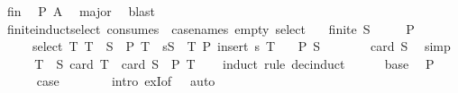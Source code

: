 \begin{isabellebody}
\ fin\ \isamarkupfalse%
\ {\isachardoublequoteopen}P\ A{\isachardoublequoteclose}\ \isamarkupfalse%
\ major\ \isamarkupfalse%
\ blast\isanewline
{}\isamarkupfalse%
%
\endisatagproof
{\isafoldproof}%
%
\isadelimproof
\isanewline
%
\endisadelimproof
\isanewline
{}\isamarkupfalse%
\ finite{\isacharunderscore}{\kern0pt}induct{\isacharunderscore}{\kern0pt}select\ {\isacharbrackleft}{\kern0pt}consumes\ {}{\isacharcomma}{\kern0pt}\ case{\isacharunderscore}{\kern0pt}names\ empty\ select{\isacharbrackright}{\kern0pt}{\isacharcolon}{\kern0pt}\isanewline
\ \ \ {\isachardoublequoteopen}finite\ S{\isachardoublequoteclose}\isanewline
\ \ \ \ \ {\isachardoublequoteopen}P\ {\isacharbraceleft}{\kern0pt}{\isacharbraceright}{\kern0pt}{\isachardoublequoteclose}\isanewline
\ \ \ \ \ select{\isacharcolon}{\kern0pt}\ {\isachardoublequoteopen}{\isasymAnd}T{\isachardot}{\kern0pt}\ T\ {\isasymsubset}\ S\ {\isasymLongrightarrow}\ P\ T\ {\isasymLongrightarrow}\ {\isasymexists}s{\isasymin}S\ {\isacharminus}{\kern0pt}\ T{\isachardot}{\kern0pt}\ P\ {\isacharparenleft}{\kern0pt}insert\ s\ T{\isacharparenright}{\kern0pt}{\isachardoublequoteclose}\isanewline
\ \ \ {\isachardoublequoteopen}P\ S{\isachardoublequoteclose}\isanewline
%
\isadelimproof
%
\endisadelimproof
%
\isatagproof
{}\isamarkupfalse%
\ {\isacharminus}{\kern0pt}\isanewline
\ \ \isamarkupfalse%
\ {\isachardoublequoteopen}{}\ {\isasymle}\ card\ S{\isachardoublequoteclose}\ \isamarkupfalse%
\ simp\isanewline
\ \ \isamarkupfalse%
\ \isamarkupfalse%
\ {\isachardoublequoteopen}{\isasymexists}T\ {\isasymsubseteq}\ S{\isachardot}{\kern0pt}\ card\ T\ {\isacharequal}{\kern0pt}\ card\ S\ {\isasymand}\ P\ T{\isachardoublequoteclose}\isanewline
\ \ \isamarkupfalse%
\ {\isacharparenleft}{\kern0pt}induct\ rule{\isacharcolon}{\kern0pt}\ dec{\isacharunderscore}{\kern0pt}induct{\isacharparenright}{\kern0pt}\isanewline
\ \ \ \ \isamarkupfalse%
\ base\ \isamarkupfalse%
\ {\isacartoucheopen}P\ {\isacharbraceleft}{\kern0pt}{\isacharbraceright}{\kern0pt}{\isacartoucheclose}\isanewline
\ \ \ \ \isamarkupfalse%
\ {\isacharquery}{\kern0pt}case\isanewline
\ \ \ \ \ \ \isamarkupfalse%
\ {\isacharparenleft}{\kern0pt}intro\ exI{\isacharbrackleft}{\kern0pt}of\ {\isacharunderscore}{\kern0pt}\ {\isachardoublequoteopen}{\isacharbraceleft}{\kern0pt}{\isacharbraceright}{\kern0pt}{\isachardoublequoteclose}{\isacharbrackright}{\kern0pt}{\isacharparenright}{\kern0pt}\ auto\isanewline

\end{isabellebody}

